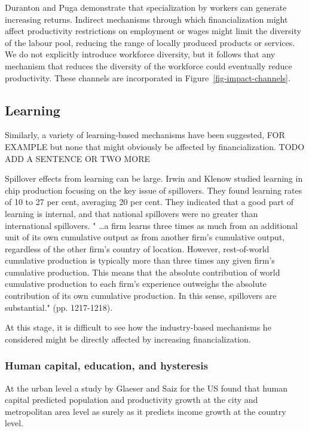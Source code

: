 \documentclass[a4paper]{article}
\theoremstyle{definition}
\theoremstyle{plain}
\begin{document}
{Duranton and Puga demonstrate that specialization by workers can generate increasing returns. Indirect mechanisms through which financialization might affect productivity restrictions on employment or wages might limit the diversity of the labour pool, reducing the range of locally produced products or services.  We do not explicitly introduce workforce diversity, but it follows that any mechanism that reduces the diversity of the workforce could eventually reduce productivity. These channels are incorporated in Figure~\ref{fig-impact-channels}.
 
\subsection{Learning}
Similarly, a variety of learning-based mechanisms have been suggested, FOR EXAMPLE but none that might obviously be affected by financialization. TODO ADD A SENTENCE OR TWO MORE

Spillover effects from learning can be large. Irwin and Klenow  studied learning in chip production focusing  on the key issue of spillovers. They found learning rates of 10 to 27 per cent, averaging 20 per cent. They indicated that a good part of learning is internal, and that national spillovers were no greater than international spillovers. " \dots a firm learns three times as much from an additional unit of its own cumulative output as from another firm's cumulative output, regardless of the other firm's country of location. However, rest-of-world cumulative production is typically more than three times any given firm's cumulative production. This means that the absolute contribution of world cumulative production to each firm's experience outweighs the absolute contribution of its own cumulative production. In this sense, spillovers are substantial." (pp. 1217-1218).

At this stage, it is difficult to see how the industry-based mechanisms he considered might be directly affected by increasing financialization. 


\subsubsection{Human capital, education, and hysteresis}

At the urban level a study by Glaeser and Saiz \cite{glaeserRiseSkilledCity2003} for the US found that human capital predicted population and productivity growth at the city and metropolitan area level as surely as it predicts income growth at the country level. 

}
\end{document}

